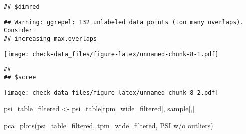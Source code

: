 \documentclass[
]{article}
\newenvironment{Shaded}{\begin{snugshade}}{\end{snugshade}}
\newcommand{\AttributeTok}[1]{\textcolor[rgb]{0.77,0.63,0.00}{#1}}
\newcommand{\ConstantTok}[1]{\textcolor[rgb]{0.00,0.00,0.00}{#1}}
\newcommand{\ControlFlowTok}[1]{\textcolor[rgb]{0.13,0.29,0.53}{\textbf{#1}}}
\newcommand{\FunctionTok}[1]{\textcolor[rgb]{0.00,0.00,0.00}{#1}}
\newcommand{\NormalTok}[1]{#1}
\newcommand{\OtherTok}[1]{\textcolor[rgb]{0.56,0.35,0.01}{#1}}
\newcommand{\SpecialCharTok}[1]{\textcolor[rgb]{0.00,0.00,0.00}{#1}}
\newcommand{\StringTok}[1]{\textcolor[rgb]{0.31,0.60,0.02}{#1}}
\begin{document}
\begin{Shaded}
\end{Shaded}

\begin{verbatim}
## $dimred
\end{verbatim}

\begin{verbatim}
## Warning: ggrepel: 132 unlabeled data points (too many overlaps). Consider
## increasing max.overlaps
\end{verbatim}

\texttt{[image: check-data\_files/figure-latex/unnamed-chunk-8-1.pdf]}

\begin{verbatim}
## 
## $scree
\end{verbatim}

\texttt{[image: check-data\_files/figure-latex/unnamed-chunk-8-2.pdf]}

\begin{Shaded}
\begin{Highlighting}[]
\NormalTok{psi\_table\_filtered }\OtherTok{\textless{}{-}}\NormalTok{ psi\_table[tpm\_wide\_filtered[, sample],]}

\FunctionTok{pca\_plots}\NormalTok{(psi\_table\_filtered, tpm\_wide\_filtered, }\StringTok{\textquotesingle{}PSI w/o outliers\textquotesingle{}}\NormalTok{)}
\end{Highlighting}
\end{Shaded}
\end{document}

